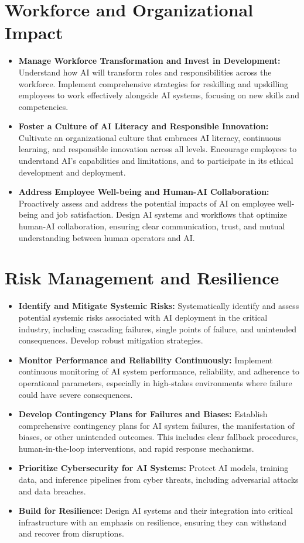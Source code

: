 \section*{Workforce and Organizational Impact}
\begin{itemize}
    \item \textbf{Manage Workforce Transformation and Invest in Development:} Understand how AI will transform roles and responsibilities across the workforce. Implement comprehensive strategies for reskilling and upskilling employees to work effectively alongside AI systems, focusing on new skills and competencies.
    \item \textbf{Foster a Culture of AI Literacy and Responsible Innovation:} Cultivate an organizational culture that embraces AI literacy, continuous learning, and responsible innovation across all levels. Encourage employees to understand AI's capabilities and limitations, and to participate in its ethical development and deployment.
    \item \textbf{Address Employee Well-being and Human-AI Collaboration:} Proactively assess and address the potential impacts of AI on employee well-being and job satisfaction. Design AI systems and workflows that optimize human-AI collaboration, ensuring clear communication, trust, and mutual understanding between human operators and AI.
\end{itemize}

\section*{Risk Management and Resilience}
\begin{itemize}
    \item \textbf{Identify and Mitigate Systemic Risks:} Systematically identify and assess potential systemic risks associated with AI deployment in the critical industry, including cascading failures, single points of failure, and unintended consequences. Develop robust mitigation strategies.
    \item \textbf{Monitor Performance and Reliability Continuously:} Implement continuous monitoring of AI system performance, reliability, and adherence to operational parameters, especially in high-stakes environments where failure could have severe consequences.
    \item \textbf{Develop Contingency Plans for Failures and Biases:} Establish comprehensive contingency plans for AI system failures, the manifestation of biases, or other unintended outcomes. This includes clear fallback procedures, human-in-the-loop interventions, and rapid response mechanisms.
    \item \textbf{Prioritize Cybersecurity for AI Systems:} Protect AI models, training data, and inference pipelines from cyber threats, including adversarial attacks and data breaches.
    \item \textbf{Build for Resilience:} Design AI systems and their integration into critical infrastructure with an emphasis on resilience, ensuring they can withstand and recover from disruptions.
\end{itemize}


